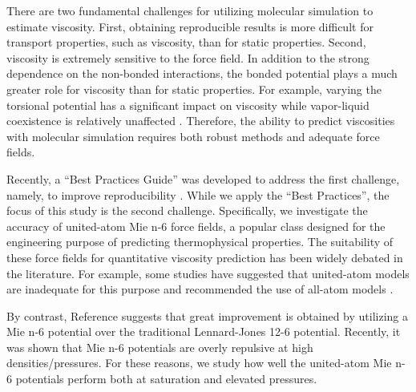 \documentclass[preprint,review,12pt]{elsarticle}
\begin{document}
	
	
	There are two fundamental challenges for utilizing molecular simulation to estimate viscosity. First, obtaining reproducible results is more difficult for transport properties, such as viscosity, than for static properties. Second, viscosity is extremely sensitive to the force field. In addition to the strong dependence on the non-bonded interactions, the bonded potential plays a much greater role for viscosity than for static properties. For example, varying the torsional potential has a significant impact on viscosity \cite{BLANK} while vapor-liquid coexistence is relatively unaffected \cite{BLANK}. Therefore, the ability to predict viscosities with molecular simulation requires both robust methods and adequate force fields. 
	
	
	
	
	Recently, a ``Best Practices Guide'' was developed to address the first challenge, namely, to improve reproducibility \cite{Maginn2018}. While we apply the ``Best Practices'', the focus of this study is the second challenge. Specifically, we investigate the accuracy of united-atom Mie n-6 force fields, a popular class designed for the engineering purpose of predicting thermophysical properties. The suitability of these force fields for quantitative viscosity prediction has been widely debated in the literature. For example, some studies have suggested that united-atom models are inadequate for this purpose and recommended the use of all-atom models \cite{Allen1997,Payal2012,Mondello1997}. 
	
	By contrast, Reference  suggests that great improvement is obtained by utilizing a Mie n-6 potential over the traditional Lennard-Jones 12-6 potential. Recently, it was shown that Mie n-6 potentials are overly repulsive at high densities/pressures. For these reasons, we study how well the united-atom Mie n-6 potentials perform both at saturation and elevated pressures.
	
\end{document}
